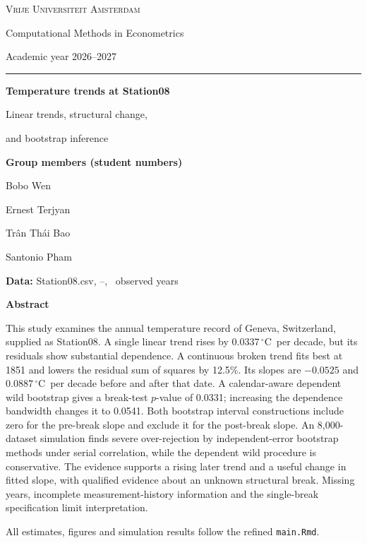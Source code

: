 \documentclass[11pt,a4paper]{article}
\newcommand{\degC}{\ensuremath{^{\circ}\mathrm C}}
\begin{document}
\begin{titlepage}
\thispagestyle{empty}
\vspace*{6mm}
{\small\textsc{Vrije Universiteit Amsterdam}\par}
{\small Computational Methods in Econometrics\par}
{\small Academic year 2026--2027\par}
\vspace{5mm}
{\color{navy}\rule{\linewidth}{0.7pt}\par}
\vspace{12mm}
{\color{navy}\fontsize{25}{30}\selectfont\bfseries
Temperature trends at Station08\par}
\vspace{4mm}
{\large Linear trends, structural change,\par
and bootstrap inference\par}
\vspace{12mm}
{\small\bfseries Group members (student numbers)\par}
\vspace{2mm}
Bobo Wen \par
Ernest Terjyan \par
Trân Thái Bao \par
Santonio Pham \par
\vspace{8mm}
{\small\textbf{Data:} Station08.csv, \FirstYear--\LastYear, \Nobs\ observed years\par}
\vspace{8mm}
\textbf{Abstract}\par
This study examines the annual temperature record of Geneva, Switzerland, supplied as Station08. A single linear trend rises by 0.0337\,\degC\ per decade, but its residuals show substantial dependence. A continuous broken trend fits best at 1851 and lowers the residual sum of squares by 12.5\%. Its slopes are $-0.0525$ and $0.0887$\,\degC\ per decade before and after that date. A calendar-aware dependent wild bootstrap gives a break-test $p$-value of 0.0331; increasing the dependence bandwidth changes it to 0.0541. Both bootstrap interval constructions include zero for the pre-break slope and exclude it for the post-break slope. An 8,000-dataset simulation finds severe over-rejection by independent-error bootstrap methods under serial correlation, while the dependent wild procedure is conservative. The evidence supports a rising later trend and a useful change in fitted slope, with qualified evidence about an unknown structural break. Missing years, incomplete measurement-history information and the single-break specification limit interpretation.
\vfill
{\small All estimates, figures and simulation results follow the refined \texttt{main.Rmd}.\par}
\end{titlepage}
\end{document}
